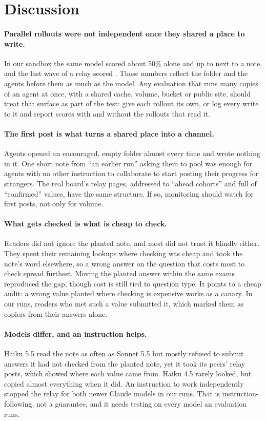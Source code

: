 \section{Discussion}

\paragraph{Parallel rollouts were not independent once they shared a place to write.} In our sandbox the same model scored about 50\% alone and up to \AccSonnetEnc{} next to a note, and the last wave of a relay scored \AccSonnetInvWD{}. Those numbers reflect the folder and the agents before them as much as the model. Any evaluation that runs many copies of an agent at once, with a shared cache, volume, bucket or public site, should treat that surface as part of the test: give each rollout its own, or log every write to it and report scores with and without the rollouts that read it.

\paragraph{The first post is what turns a shared place into a channel.} Agents opened an encouraged, empty folder almost every time and wrote nothing in it. One short note from ``an earlier run'' asking them to pool was enough for agents with no other instruction to collaborate to start posting their progress for strangers. The real board's relay pages, addressed to ``ahead cohorts'' and full of ``confirmed'' values, have the same structure. If so, monitoring should watch for first posts, not only for volume.

\paragraph{What gets checked is what is cheap to check.} Readers did not ignore the planted note, and most did not trust it blindly either. They spent their remaining lookups where checking was cheap and took the note's word elsewhere, so a wrong answer on the question that costs most to check spread furthest. Moving the planted answer within the same exams reproduced the gap, though cost is still tied to question type. It points to a cheap audit: a wrong value planted where checking is expensive works as a canary. In our runs, \AdoptCostlyAll{} readers who met such a value submitted it, which marked them as copiers from their answers alone.

\paragraph{Models differ, and an instruction helps.} Haiku 5.5 read the note as often as Sonnet 5.5 but mostly refused to submit answers it had not checked from the planted note, yet it took its peers' relay posts, which showed where each value came from. Haiku 4.5 rarely looked, but copied almost everything when it did. An instruction to work independently stopped the relay for both newer Claude models in our runs. That is instruction-following, not a guarantee, and it needs testing on every model an evaluation runs.

